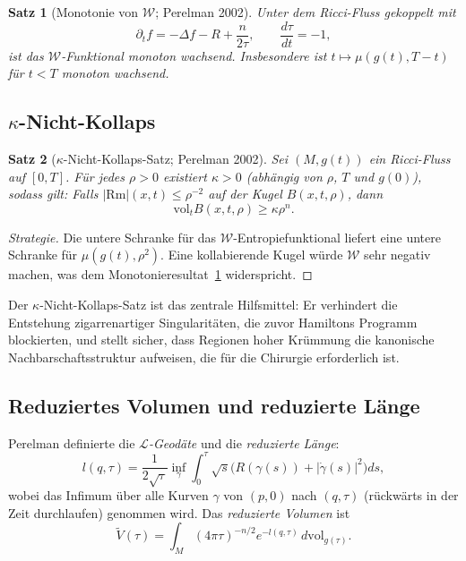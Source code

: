 \documentclass[12pt,a4paper]{amsart}
\newtheorem{theorem}{Satz}[section]
\theoremstyle{definition}
\theoremstyle{remark}
\newcommand{\Rm}{\mathrm{Rm}}
\newcommand{\vol}{\mathrm{vol}}
\begin{document}
\begin{theorem}[Monotonie von $\mathcal{W}$; Perelman 2002]
\label{thm:W-mono}
Unter dem Ricci-Fluss gekoppelt mit
\[
  \partial_t f = -\Delta f - R + \frac{n}{2\tau}, \qquad
  \frac{d\tau}{dt} = -1,
\]
ist das $\mathcal{W}$-Funktional monoton wachsend.  Insbesondere ist
$t \mapsto \mu(g(t), T-t)$ für $t < T$ monoton wachsend.
\end{theorem}

\subsection{$\kappa$-Nicht-Kollaps}

\begin{theorem}[$\kappa$-Nicht-Kollaps-Satz; Perelman 2002]
\label{thm:kappa}
Sei $(M,g(t))$ ein Ricci-Fluss auf $[0,T]$.  Für jedes $\rho > 0$ existiert
$\kappa > 0$ (abhängig von $\rho$, $T$ und $g(0)$), sodass gilt: Falls
$|\Rm|(x,t) \leq \rho^{-2}$ auf der Kugel $B(x,t,\rho)$, dann
\[
  \vol_t B(x,t,\rho) \geq \kappa \rho^n.
\]
\end{theorem}

\begin{proof}[Strategie]
Die untere Schranke für das $\mathcal{W}$-Entropiefunktional liefert eine
untere Schranke für $\mu(g(t),\rho^2)$.  Eine kollabierende Kugel würde
$\mathcal{W}$ sehr negativ machen, was dem Monotonieresultat~\ref{thm:W-mono}
widerspricht.
\end{proof}

Der $\kappa$-Nicht-Kollaps-Satz ist das zentrale Hilfsmittel: Er verhindert
die Entstehung zigarrenartiger Singularitäten, die zuvor Hamiltons Programm
blockierten, und stellt sicher, dass Regionen hoher Krümmung die
kanonische Nachbarschaftsstruktur aufweisen, die für die Chirurgie
erforderlich ist.

\subsection{Reduziertes Volumen und reduzierte Länge}

Perelman definierte die \emph{$\mathcal{L}$-Geodäte} und die
\emph{reduzierte Länge}:
\begin{equation}
  l(q,\tau) = \frac{1}{2\sqrt{\tau}}
    \inf_\gamma \int_0^\tau \sqrt{s}\bigl(R(\gamma(s)) + |\dot\gamma(s)|^2\bigr)ds,
\end{equation}
wobei das Infimum über alle Kurven $\gamma$ von $(p,0)$ nach $(q,\tau)$
(rückwärts in der Zeit durchlaufen) genommen wird.  Das
\emph{reduzierte Volumen} ist
\begin{equation}
  \tilde V(\tau) = \int_M (4\pi\tau)^{-n/2} e^{-l(q,\tau)}\,d\vol_{g(\tau)}.
\end{equation}
\end{document}
